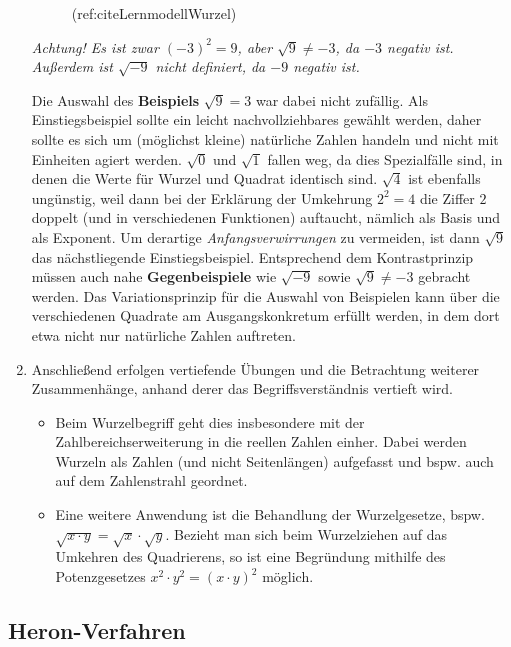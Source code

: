 \documentclass[
]{scrbook}
\theoremstyle{definition}
\theoremstyle{definition}
\theoremstyle{definition}
\theoremstyle{definition}
\theoremstyle{remark}
\begin{document}
\begin{enumerate}
\begin{figure}
{   }

   \caption{(ref:citeLernmodellWurzel)}\label{fig:LernmodellWurzel}
   \end{figure}

  \emph{Achtung! Es ist zwar \((-3)^2 = 9\), aber \(\sqrt{9} \neq -3\), da \(-3\) negativ ist. Außerdem ist \(\sqrt{-9}\) nicht definiert, da \(-9\) negativ ist.}

  Die Auswahl des \textbf{Beispiels} \(\sqrt{9}=3\) war dabei nicht zufällig. Als Einstiegsbeispiel sollte ein leicht nachvollziehbares gewählt werden, daher sollte es sich um (möglichst kleine) natürliche Zahlen handeln und nicht mit Einheiten agiert werden. \(\sqrt{0}\) und \(\sqrt{1}\) fallen weg, da dies Spezialfälle sind, in denen die Werte für Wurzel und Quadrat identisch sind. \(\sqrt{4}\) ist ebenfalls ungünstig, weil dann bei der Erklärung der Umkehrung \(2^2 = 4\) die Ziffer \(2\) doppelt (und in verschiedenen Funktionen) auftaucht, nämlich als Basis und als Exponent. Um derartige \emph{Anfangsverwirrungen} zu vermeiden, ist dann \(\sqrt{9}\) das nächstliegende Einstiegsbeispiel. Entsprechend dem Kontrastprinzip müssen auch nahe \textbf{Gegenbeispiele} wie \(\sqrt{-9}\) sowie \(\sqrt{9}\neq -3\) gebracht werden. Das Variationsprinzip für die Auswahl von Beispielen kann über die verschiedenen Quadrate am Ausgangskonkretum erfüllt werden, in dem dort etwa nicht nur natürliche Zahlen auftreten.
\item
  Anschließend erfolgen vertiefende Übungen und die Betrachtung weiterer Zusammenhänge, anhand derer das Begriffsverständnis vertieft wird.

  \begin{itemize}
  \item
    Beim Wurzelbegriff geht dies insbesondere mit der Zahlbereichserweiterung in die reellen Zahlen einher. Dabei werden Wurzeln als Zahlen (und nicht Seitenlängen) aufgefasst und bspw. auch auf dem Zahlenstrahl geordnet.
  \item
    Eine weitere Anwendung ist die Behandlung der Wurzelgesetze, bspw. \(\sqrt{x\cdot y} = \sqrt{x}\cdot \sqrt{y}\). Bezieht man sich beim Wurzelziehen auf das Umkehren des Quadrierens, so ist eine Begründung mithilfe des Potenzgesetzes \(x^2\cdot y^2 = (x\cdot y)^2\) möglich.
  \end{itemize}
\end{enumerate}

\subsection{Heron-Verfahren}\label{heron-verfahren}
\end{document}
